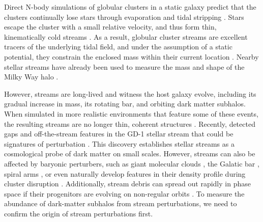 \documentclass[twocolumn]{aastex62}
\begin{document}
Direct N-body simulations of globular clusters in a static galaxy predict that the clusters continually lose stars through evaporation and tidal stripping \citep[e.g.,][]{Baumgardt:2003}.
Stars escape the cluster with a small relative velocity, and thus form thin, kinematically cold streams \citep[e.g.,][]{Combes:1999}.
As a result, globular cluster streams are excellent tracers of the underlying tidal field, and under the assumption of a static potential, they constrain the enclosed mass within their current location \citep{Bonaca:2018}.
Nearby stellar streams have already been used to measure the mass and shape of the Milky Way halo \citep[e.g.,][]{Koposov:2010, Kupper:2015, Bovy:2016}.

However, streams are long-lived and witness the host galaxy evolve, including its gradual increase in mass, its rotating bar, and orbiting dark matter subhalos.
When simulated in more realistic environments that feature some of these events, the resulting streams are no longer 
thin, coherent structures \citep[e.g.,][]{Bonaca:2014, Ngan:2015, Price-Whelan:2016b}. Recently, \citet{Price-Whelan:2018} detected gaps and off-the-stream features in the GD-1 stellar stream that could be signatures of perturbation \citep{Bonaca:2018b}.
This discovery establishes stellar streams as a cosmological probe of dark matter on small scales.
However, streams can also be affected by baryonic perturbers, such as giant molecular clouds \citep{Amorisco:2016}, the Galatic bar \citep{Pearson:2017}, spiral arms \citep{Banik:2019}, or even naturally develop features in their density profile during cluster disruption \citep[e.g.,][]{Kupper:2008, Just:2009}. Additionally, stream debris can spread out rapidly in phase space if their progenitors are evolving on non-regular orbits \citep[e.g.,][]{Pearson:2015, Fardal:2015, Price-Whelan:2016}.
To measure the abundance of dark-matter subhalos from stream perturbations, we need to confirm the origin of stream perturbations first.
\end{document}

